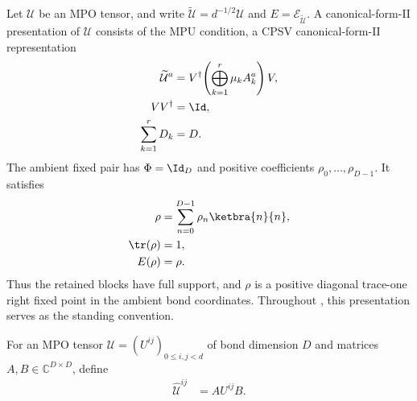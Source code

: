 \begin{definition}
    \label{def:mpu_canonical_form_ii}
    \leanok
    Let $\mathcal U$ be an MPO tensor, and write
    $\widetilde{\mathcal U}=d^{-1/2}\mathcal U$ and
    $E=\mathcal E_{\widetilde{\mathcal U}}$. A canonical-form-II presentation
    of $\mathcal U$ consists of the MPU condition, a CPSV
    canonical-form-II representation
    \begin{align}
        \widetilde{\mathcal U}^{a}
                          & =V^\dagger\!\left(\bigoplus_{k=1}^{r}\mu_kA_k^{a}\right)V,
        \notag                                                                         \\
        VV^\dagger        & =\Id,
        \notag                                                                         \\
        \sum_{k=1}^{r}D_k & =D.
        \label{eq:mpu_ambient_cfii}
    \end{align}
    The ambient fixed pair has $\Phi=\Id_D$ and positive coefficients
    $\rho_0,\ldots,\rho_{D-1}$. It satisfies
    \begin{align}
        \rho      & =\sum_{n=0}^{D-1}\rho_n\ketbra{n}{n},
        \notag                                            \\
        \tr(\rho) & =1,
        \notag                                            \\
        E(\rho)   & =\rho.
        \label{eq:mpu_ambient_cfii_fixed_pair}
    \end{align}
    Thus the retained blocks have full support, and $\rho$ is a
    positive diagonal trace-one right fixed point in the ambient bond
    coordinates. Throughout \cite[lines~269--281, 344--356, and 488--502]{Cirac2017MPU}, this presentation serves as the standing
    convention.
\end{definition}

\begin{definition}
    \label{def:mpu_virtual_sandwich}
    \leanok
    For an MPO tensor $\mathcal U=(U^{ij})_{0\leq i,j<d}$ of bond dimension $D$
    and matrices $A,B\in\mathbb C^{D\times D}$, define
    \begin{align}
        \widehat{\mathcal U}^{ij} & =A U^{ij}B.
    \end{align}
\end{definition}

